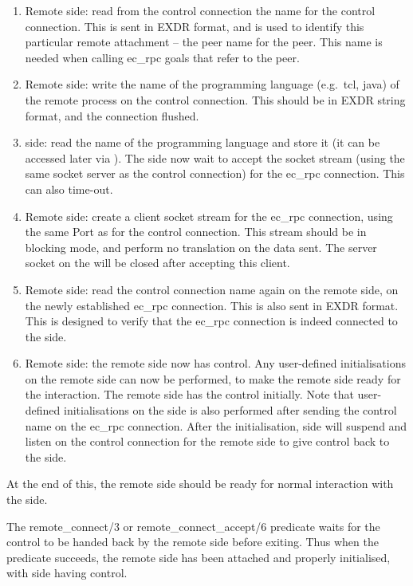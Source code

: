 \begin{enumerate}
\item Remote side: read from the control connection the {\eclipse} name for the control
connection. This is sent in EXDR format, and is used to identify this
particular remote attachment -- the peer name for the peer. This name is needed when calling ec_rpc goals
that refer to the peer. 
\item Remote side: write the name of the programming language (e.g.\ tcl, java) of the
remote process on the control connection. This should be in EXDR string
format, and the connection flushed. 
\item {\eclipse} side: read the name of the programming language and store
it (it can be accessed later via ). The {\eclipse}
side now wait to accept the socket stream (using the same socket server as
the control connection) for the ec_rpc connection. This can also time-out.
\item Remote side: create a client socket stream for the ec_rpc connection, using the
same Port as for the control connection. This stream should be in
blocking mode, and perform no translation on the data sent. The server
socket on the {\eclipse} will be closed after accepting this client.
\item Remote side: read the control connection name again on the remote side, on the
newly established ec_rpc connection. This is also sent in EXDR format. This
is designed to verify that the ec_rpc connection is indeed connected to the
{\eclipse} side. 
\item Remote side: the remote side now has control. Any user-defined initialisations on the remote
side can now be performed, to make the remote side ready for the
interaction. The remote side has the control initially. Note that
user-defined initialisations on the {\eclipse} side is also performed after
sending the control name on the ec_rpc connection. After the
initialisation, {\eclipse} side will suspend and listen on the control
connection for the remote side to give control back to the {\eclipse} side.
\end{enumerate}

At the end of this, the remote side should be ready for normal interaction
with the {\eclipse} side.

The remote_connect/3 or remote_connect_accept/6 predicate waits for the control to be handed back by
the remote side before exiting. Thus when the predicate succeeds, the
remote side has been attached and properly initialised, with {\eclipse}
side having control.

